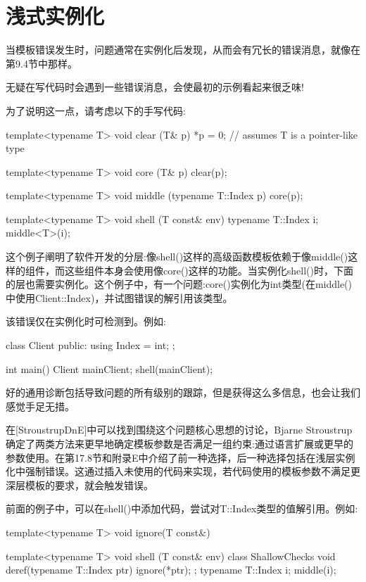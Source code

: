 \section{浅式实例化}
当模板错误发生时，问题通常在实例化后发现，从而会有冗长的错误消息，就像在第9.4节中那样。

\begin{notice}
无疑在写代码时会遇到一些错误消息，会使最初的示例看起来很乏味!
\end{notice}

为了说明这一点，请考虑以下的手写代码:

\begin{cpp}
template<typename T>
void clear (T& p)
{
	*p = 0; // assumes T is a pointer-like type
}

template<typename T>
void core (T& p)
{
	clear(p);
}

template<typename T>
void middle (typename T::Index p)
{
	core(p);
}

template<typename T>
void shell (T const& env)
{
	typename T::Index i;
	middle<T>(i);
}
\end{cpp}

这个例子阐明了软件开发的分层:像shell()这样的高级函数模板依赖于像middle()这样的组件，而这些组件本身会使用像core()这样的功能。当实例化shell()时，下面的层也需要实例化。这个例子中，有一个问题:core()实例化为int类型(在middle()中使用Client::Index)，并试图错误的解引用该类型。

该错误仅在实例化时可检测到。例如:

\begin{cpp}
class Client
{
	public:
	using Index = int;
};

int main()
{
	Client mainClient;
	shell(mainClient);
}
\end{cpp}

好的通用诊断包括导致问题的所有级别的跟踪，但是获得这么多信息，也会让我们感觉手足无措。

在[StroustrupDnE]中可以找到围绕这个问题核心思想的讨论，Bjarne Stroustrup确定了两类方法来更早地确定模板参数是否满足一组约束:通过语言扩展或更早的参数使用。在第17.8节和附录E中介绍了前一种选择，后一种选择包括在浅层实例化中强制错误。这通过插入未使用的代码来实现，若代码使用的模板参数不满足更深层模板的要求，就会触发错误。

前面的例子中，可以在shell()中添加代码，尝试对T::Index类型的值解引用。例如:

\begin{cpp}
template<typename T>
void ignore(T const&)
{ }

template<typename T>
void shell (T const& env)
{
	class ShallowChecks
	{
		void deref(typename T::Index ptr) {
			ignore(*ptr);
		}
	};
	typename T::Index i;
	middle(i);
}
\end{cpp}

